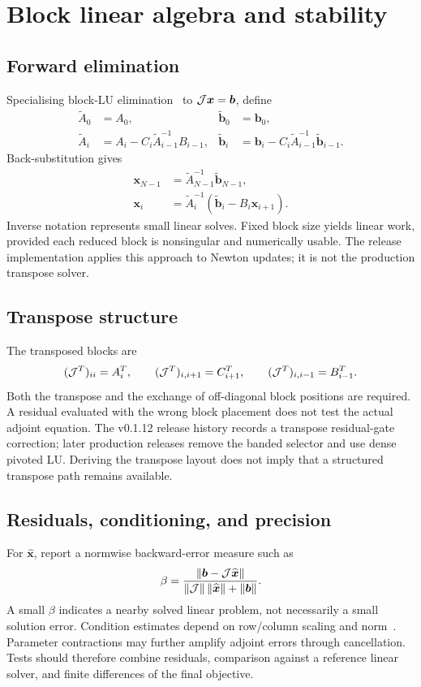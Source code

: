 \documentclass[11pt,a4paper]{article}
\numberwithin{equation}{section}
\begin{document}
\section{Block linear algebra and stability}\label{supp:linear}
\subsection{Forward elimination}
Specialising block-LU elimination~\cite{demmel1995} to
$\mathcal{J}\boldsymbol x=\boldsymbol b$, define
\begin{align}
\widetilde A_0&=A_0,&\widetilde{\boldsymbol b}_0&=\boldsymbol b_0,\\
\widetilde A_i&=A_i-C_i\widetilde A_{i-1}^{-1}B_{i-1},&
\widetilde{\boldsymbol b}_i&=\boldsymbol b_i
-C_i\widetilde A_{i-1}^{-1}\widetilde{\boldsymbol b}_{i-1}.
\end{align}
Back-substitution gives
\begin{align}
\boldsymbol x_{N-1}&=\widetilde A_{N-1}^{-1}\widetilde{\boldsymbol b}_{N-1},\\
\boldsymbol x_i&=\widetilde A_i^{-1}
(\widetilde{\boldsymbol b}_i-B_i\boldsymbol x_{i+1}).
\end{align}
Inverse notation represents small linear solves. Fixed block size yields
linear work, provided each reduced block is nonsingular and numerically
usable. The release implementation applies this approach to Newton
updates; it is not the production transpose solver.

\subsection{Transpose structure}
The transposed blocks are
\begin{equation}
(\mathcal{J}^T)_{ii}=A_i^T,\qquad
(\mathcal{J}^T)_{i,i+1}=C_{i+1}^T,\qquad
(\mathcal{J}^T)_{i,i-1}=B_{i-1}^T.
\end{equation}
Both the transpose and the exchange of off-diagonal block positions are
required. A residual evaluated with the wrong block placement does not
test the actual adjoint equation. The v0.1.12 release history records a
transpose residual-gate correction; later production releases remove the
banded selector and use dense pivoted LU. Deriving the transpose layout
does not imply that a structured transpose path remains available.

\subsection{Residuals, conditioning, and precision}
For $\widehat{\boldsymbol x}$, report a normwise backward-error measure
such as
\begin{equation}
\beta=\frac{\|\boldsymbol b-\mathcal{J}\widehat{\boldsymbol x}\|}
{\|\mathcal{J}\|\,\|\widehat{\boldsymbol x}\|+\|\boldsymbol b\|}.
\end{equation}
A small $\beta$ indicates a nearby solved linear problem, not necessarily
a small solution error. Condition estimates depend on row/column scaling
and norm~\cite{lapack1999}. Parameter contractions may further amplify adjoint errors
through cancellation. Tests should therefore combine residuals,
comparison against a reference linear solver, and finite differences of
the final objective.
\end{document}
